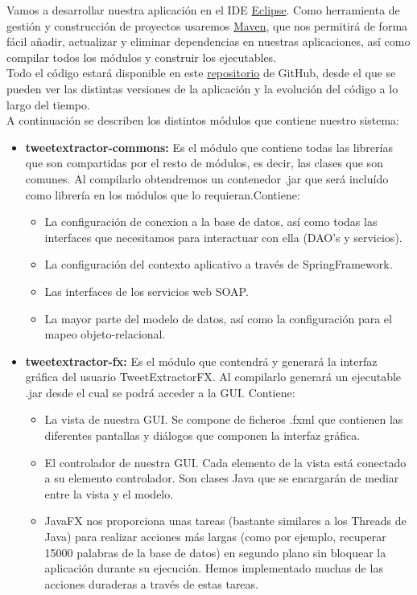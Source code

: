 Vamos a desarrollar nuestra aplicación en el IDE \href{https://www.eclipse.org/}{Eclipse}. Como herramienta de gestión y construcción de proyectos usaremos \href{https://maven.apache.org/}{Maven}, que nos permitirá de forma fácil añadir, actualizar y eliminar dependencias en nuestras aplicaciones, así como compilar todos los módulos y construir los ejecutables.\\

Todo el código estará disponible en este \href{https://github.com/plyskor/TweetExtractor}{repositorio} de GitHub, desde el que se pueden ver las distintas versiones de la aplicación y la evolución del código a lo largo del tiempo.\\
A continuación se describen los distintos módulos que contiene nuestro sistema:

\begin{itemize}
	\item \textbf{tweetextractor-commons:} Es el módulo que contiene todas las librerías que son compartidas por el resto de módulos, es decir, las clases que son comunes. Al compilarlo obtendremos un contenedor .jar que será incluído como librería en los módulos que lo requieran.Contiene:
	\begin{itemize}
		\item La configuración de conexion a la base de datos, así como todas las interfaces que necesitamos para interactuar con ella (DAO's y servicios).
		\item La configuración del contexto aplicativo a través de SpringFramework.
		\item Las interfaces de los servicios web SOAP.
		\item La mayor parte del modelo de datos, así como la configuración para el mapeo objeto-relacional.
	\end{itemize}
	\item \textbf{tweetextractor-fx:} Es el módulo que contendrá y generará la interfaz gráfica del usuario TweetExtractorFX. Al compilarlo generará un ejecutable .jar desde el cual se podrá acceder a la GUI. Contiene:
	 \begin{itemize}
	 	\item La vista de nuestra GUI. Se compone de ficheros .fxml que contienen las diferentes pantallas y diálogos que componen la interfaz gráfica.
	 	\item El controlador de nuestra GUI. Cada elemento de la vista está conectado a su elemento controlador. Son clases Java que se encargarán de mediar entre la vista y el modelo.
	 	\item JavaFX nos proporciona unas tareas (bastante similares a los Threads de Java) para realizar acciones más largas (como por ejemplo, recuperar 15000 palabras de la base de datos) en segundo plano sin bloquear la aplicación durante su ejecución. Hemos implementado muchas de las acciones duraderas a través de estas tareas.

\end{itemize}
\end{itemize}
